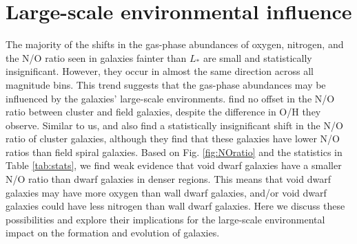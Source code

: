 %
%
\section[Discussion]{Large-scale environmental influence}\label{sec:environment}

The majority of the shifts in the gas-phase abundances of oxygen, nitrogen, and 
the N/O ratio seen in galaxies fainter than $L_*$ are small and statistically 
insignificant.  However, they occur in almost the same direction across all 
magnitude bins.  This trend suggests that the gas-phase abundances may be 
influenced by the galaxies' large-scale environments.  \cite{Shields91} find no 
offset in the N/O ratio between cluster and field galaxies, despite the 
difference in O/H they observe.  Similar to us, \cite{Contini02} and 
\cite{Pilyugin02} also find a statistically insignificant shift in the N/O ratio 
of cluster galaxies, although they find that these galaxies have lower N/O 
ratios than field spiral galaxies.  Based on Fig. \ref{fig:NOratio} and the 
statistics in Table \ref{tab:stats}, we find weak evidence that void dwarf 
galaxies have a smaller N/O ratio than dwarf galaxies in denser regions.  This 
means that void dwarf galaxies may have more oxygen than wall dwarf galaxies, 
and/or void dwarf galaxies could have less nitrogen than wall dwarf galaxies.  
Here we discuss these possibilities and explore their implications for the 
large-scale environmental impact on the formation and evolution of galaxies.

%

